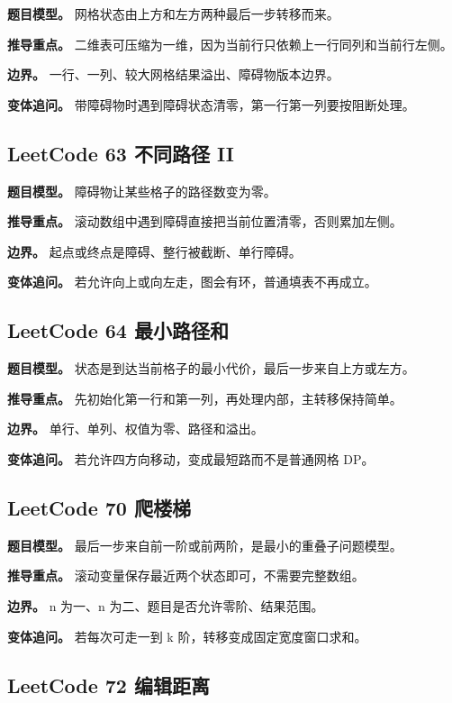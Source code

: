 \textbf{题目模型。} 网格状态由上方和左方两种最后一步转移而来。

\textbf{推导重点。} 二维表可压缩为一维，因为当前行只依赖上一行同列和当前行左侧。

\textbf{边界。} 一行、一列、较大网格结果溢出、障碍物版本边界。

\textbf{变体追问。} 带障碍物时遇到障碍状态清零，第一行第一列要按阻断处理。

\subsection{LeetCode 63 不同路径 II}

\textbf{题目模型。} 障碍物让某些格子的路径数变为零。

\textbf{推导重点。} 滚动数组中遇到障碍直接把当前位置清零，否则累加左侧。

\textbf{边界。} 起点或终点是障碍、整行被截断、单行障碍。

\textbf{变体追问。} 若允许向上或向左走，图会有环，普通填表不再成立。

\subsection{LeetCode 64 最小路径和}

\textbf{题目模型。} 状态是到达当前格子的最小代价，最后一步来自上方或左方。

\textbf{推导重点。} 先初始化第一行和第一列，再处理内部，主转移保持简单。

\textbf{边界。} 单行、单列、权值为零、路径和溢出。

\textbf{变体追问。} 若允许四方向移动，变成最短路而不是普通网格 DP。

\subsection{LeetCode 70 爬楼梯}

\textbf{题目模型。} 最后一步来自前一阶或前两阶，是最小的重叠子问题模型。

\textbf{推导重点。} 滚动变量保存最近两个状态即可，不需要完整数组。

\textbf{边界。} n 为一、n 为二、题目是否允许零阶、结果范围。

\textbf{变体追问。} 若每次可走一到 k 阶，转移变成固定宽度窗口求和。

\subsection{LeetCode 72 编辑距离}

